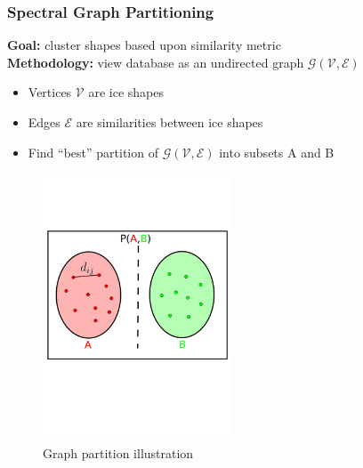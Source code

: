\documentclass[9pt]{beamer}
\begin{document}
\begin{frame}
\frametitle{Spectral Graph Partitioning}
\label{sec-3-16}

\textbf{Goal:} cluster shapes based upon similarity metric \\
\textbf{Methodology:} view database as an undirected graph
$\mathcal{G}(\mathcal{V},\mathcal{E})$
\begin{itemize}
\item Vertices $\mathcal{V}$ are ice shapes
\item Edges $\mathcal{E}$ are similarities between ice shapes
\item Find ``best'' partition of $\mathcal{G}(\mathcal{V},\mathcal{E})$ into subsets A and B
\end{itemize}
\vspace*{-1.25cm}
\begin{figure}
   \includegraphics[width=0.5\textwidth]{GraphPartition.png}
   \vspace{-2.25cm}
   \caption{Graph partition illustration} 
\end{figure}
\end{frame}
\end{document}
